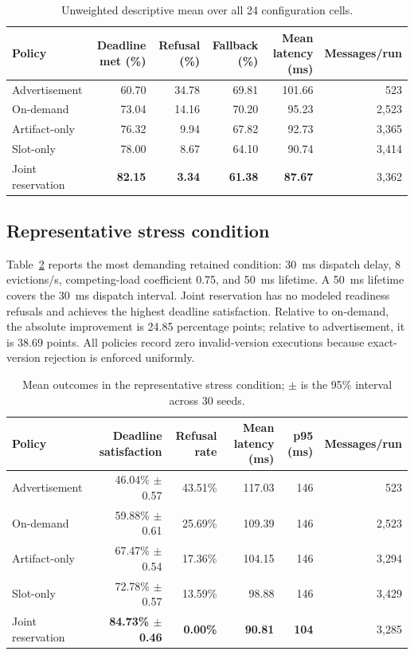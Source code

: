 \documentclass[conference]{IEEEtran}
\begin{document}
\begin{table}[t]
\centering
\caption{Unweighted descriptive mean over all 24 configuration cells.}
\label{tab:overall}
\small
\begin{tabular}{lrrrrr}
\toprule
Policy & Deadline met (\%) & Refusal (\%) & Fallback (\%) & Mean latency (ms) & Messages/run \\
\midrule
Advertisement & 60.70 & 34.78 & 69.81 & 101.66 & 523 \\
On-demand & 73.04 & 14.16 & 70.20 & 95.23 & 2,523 \\
Artifact-only & 76.32 & 9.94 & 67.82 & 92.73 & 3,365 \\
Slot-only & 78.00 & 8.67 & 64.10 & 90.74 & 3,414 \\
Joint reservation & \textbf{82.15} & \textbf{3.34} & \textbf{61.38} & \textbf{87.67} & 3,362 \\
\bottomrule
\end{tabular}
\end{table}

\subsection{Representative stress condition}

Table~\ref{tab:stress} reports the most demanding retained condition: 30~ms dispatch delay, 8 evictions/s, competing-load coefficient 0.75, and 50~ms lifetime. A 50~ms lifetime covers the 30~ms dispatch interval. Joint reservation has no modeled readiness refusals and achieves the highest deadline satisfaction. Relative to on-demand, the absolute improvement is 24.85 percentage points; relative to advertisement, it is 38.69 points. All policies record zero invalid-version executions because exact-version rejection is enforced uniformly.

\begin{table}[ht]
\centering
\caption{Mean outcomes in the representative stress condition; $\pm$ is the 95\% interval across 30 seeds.}
\label{tab:stress}
\small
\begin{tabularx}{\textwidth}{lrrrrr}
\toprule
Policy & Deadline satisfaction & Refusal rate & Mean latency (ms) & p95 (ms) & Messages/run \\
\midrule
Advertisement & 46.04\% $\pm$ 0.57 & 43.51\% & 117.03 & 146 & 523 \\
On-demand & 59.88\% $\pm$ 0.61 & 25.69\% & 109.39 & 146 & 2,523 \\
Artifact-only & 67.47\% $\pm$ 0.54 & 17.36\% & 104.15 & 146 & 3,294 \\
Slot-only & 72.78\% $\pm$ 0.57 & 13.59\% & 98.88 & 146 & 3,429 \\
Joint reservation & \textbf{84.73\% $\pm$ 0.46} & \textbf{0.00\%} & \textbf{90.81} & \textbf{104} & 3,285 \\
\bottomrule
\end{tabularx}
\end{table}
\end{document}
